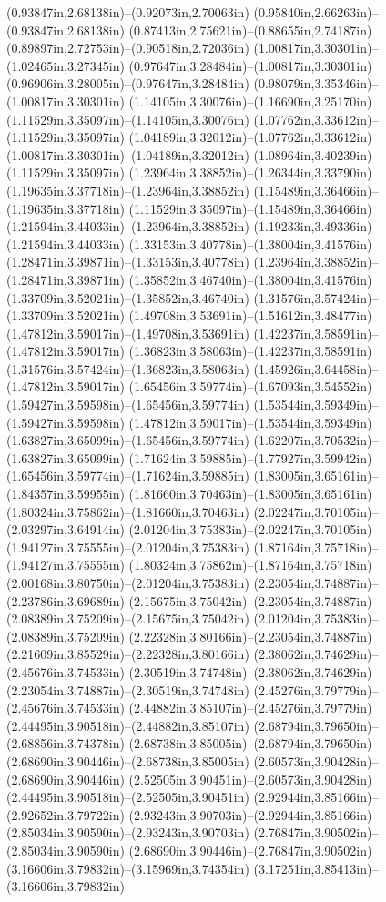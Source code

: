 (0.93847in,2.68138in)--(0.92073in,2.70063in) (0.95840in,2.66263in)--(0.93847in,2.68138in) (0.87413in,2.75621in)--(0.88655in,2.74187in) (0.89897in,2.72753in)--(0.90518in,2.72036in) (1.00817in,3.30301in)--(1.02465in,3.27345in) (0.97647in,3.28484in)--(1.00817in,3.30301in) (0.96906in,3.28005in)--(0.97647in,3.28484in) (0.98079in,3.35346in)--(1.00817in,3.30301in) (1.14105in,3.30076in)--(1.16690in,3.25170in) (1.11529in,3.35097in)--(1.14105in,3.30076in) (1.07762in,3.33612in)--(1.11529in,3.35097in) (1.04189in,3.32012in)--(1.07762in,3.33612in) (1.00817in,3.30301in)--(1.04189in,3.32012in) (1.08964in,3.40239in)--(1.11529in,3.35097in) (1.23964in,3.38852in)--(1.26344in,3.33790in) (1.19635in,3.37718in)--(1.23964in,3.38852in) (1.15489in,3.36466in)--(1.19635in,3.37718in) (1.11529in,3.35097in)--(1.15489in,3.36466in) (1.21594in,3.44033in)--(1.23964in,3.38852in) (1.19233in,3.49336in)--(1.21594in,3.44033in) (1.33153in,3.40778in)--(1.38004in,3.41576in) (1.28471in,3.39871in)--(1.33153in,3.40778in) (1.23964in,3.38852in)--(1.28471in,3.39871in) (1.35852in,3.46740in)--(1.38004in,3.41576in) (1.33709in,3.52021in)--(1.35852in,3.46740in) (1.31576in,3.57424in)--(1.33709in,3.52021in) (1.49708in,3.53691in)--(1.51612in,3.48477in) (1.47812in,3.59017in)--(1.49708in,3.53691in) (1.42237in,3.58591in)--(1.47812in,3.59017in) (1.36823in,3.58063in)--(1.42237in,3.58591in) (1.31576in,3.57424in)--(1.36823in,3.58063in) (1.45926in,3.64458in)--(1.47812in,3.59017in) (1.65456in,3.59774in)--(1.67093in,3.54552in) (1.59427in,3.59598in)--(1.65456in,3.59774in) (1.53544in,3.59349in)--(1.59427in,3.59598in) (1.47812in,3.59017in)--(1.53544in,3.59349in) (1.63827in,3.65099in)--(1.65456in,3.59774in) (1.62207in,3.70532in)--(1.63827in,3.65099in) (1.71624in,3.59885in)--(1.77927in,3.59942in) (1.65456in,3.59774in)--(1.71624in,3.59885in) (1.83005in,3.65161in)--(1.84357in,3.59955in) (1.81660in,3.70463in)--(1.83005in,3.65161in) (1.80324in,3.75862in)--(1.81660in,3.70463in) (2.02247in,3.70105in)--(2.03297in,3.64914in) (2.01204in,3.75383in)--(2.02247in,3.70105in) (1.94127in,3.75555in)--(2.01204in,3.75383in) (1.87164in,3.75718in)--(1.94127in,3.75555in) (1.80324in,3.75862in)--(1.87164in,3.75718in) (2.00168in,3.80750in)--(2.01204in,3.75383in) (2.23054in,3.74887in)--(2.23786in,3.69689in) (2.15675in,3.75042in)--(2.23054in,3.74887in) (2.08389in,3.75209in)--(2.15675in,3.75042in) (2.01204in,3.75383in)--(2.08389in,3.75209in) (2.22328in,3.80166in)--(2.23054in,3.74887in) (2.21609in,3.85529in)--(2.22328in,3.80166in) (2.38062in,3.74629in)--(2.45676in,3.74533in) (2.30519in,3.74748in)--(2.38062in,3.74629in) (2.23054in,3.74887in)--(2.30519in,3.74748in) (2.45276in,3.79779in)--(2.45676in,3.74533in) (2.44882in,3.85107in)--(2.45276in,3.79779in) (2.44495in,3.90518in)--(2.44882in,3.85107in) (2.68794in,3.79650in)--(2.68856in,3.74378in) (2.68738in,3.85005in)--(2.68794in,3.79650in) (2.68690in,3.90446in)--(2.68738in,3.85005in) (2.60573in,3.90428in)--(2.68690in,3.90446in) (2.52505in,3.90451in)--(2.60573in,3.90428in) (2.44495in,3.90518in)--(2.52505in,3.90451in) (2.92944in,3.85166in)--(2.92652in,3.79722in) (2.93243in,3.90703in)--(2.92944in,3.85166in) (2.85034in,3.90590in)--(2.93243in,3.90703in) (2.76847in,3.90502in)--(2.85034in,3.90590in) (2.68690in,3.90446in)--(2.76847in,3.90502in) (3.16606in,3.79832in)--(3.15969in,3.74354in) (3.17251in,3.85413in)--(3.16606in,3.79832in) 